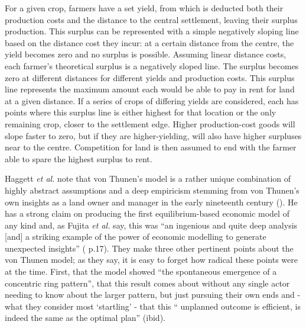 For a given crop, farmers have a set yield, from which is deducted both their production costs and the distance to the central settlement, leaving their surplus production. This surplus can be represented with a simple negatively sloping line based on the distance cost they incur: at a certain distance from the centre, the yield becomes zero and no surplus is possible. Assuming linear distance costs, each farmer's theoretical surplus is a negatively sloped line. The surplus becomes zero at different distances for different yields and production costs. This surplus line represents the maximum amount each would be able to pay in rent for land at a given distance. If a series of crops of differing yields are considered, each has points where this surplus line is either highest for that location or the only remaining crop, closer to the settlement edge. Higher production-cost goods will slope faster to zero, but if they are higher-yielding, will also have higher surpluses near to the centre. Competition for land is then assumed to end with the farmer able to spare the highest surplus to rent. 

Haggett \emph{et al.} note that von Thunen's model is a rather unique combination of highly abstract assumptions and a deep empiricism stemming from von Thunen's own insights as a land owner and manager in the early nineteenth century (\citealt{haggett_locational_1977}). He has a strong claim on producing the first equilibrium-based economic model of any kind and, as Fujita \emph{et al.} say, this was ``an ingenious and quite deep analysis [and] a striking example of the power of economic modelling to generate unexpected insights'' (\citealt{fujita_spatial_2001} p.17). They make three other pertinent points about the von Thunen model; as they say, it is easy to forget how radical these points were at the time. First, that the model showed ``the spontaneous emergence of a concentric ring pattern'', that this result comes about without any single actor needing to know about the larger pattern, but just pursuing their own ends and - what they consider most `startling'  - that this `` unplanned outcome is efficient, is indeed the same as the optimal plan'' (ibid). 

